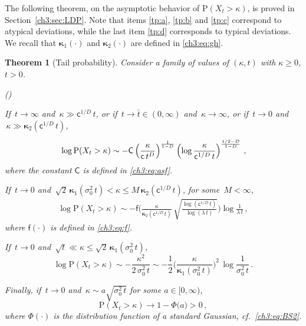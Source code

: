 \documentclass[a4paper,reqno,11pt]{amsart}
\numberwithin{equation}{section}
\newtheorem{theorem}{Theorem}[section]
\newcommand{\PEfont}{\mathrm}
\renewcommand{\P}{\ensuremath{\PEfont P}}
\newcommand\sfc{\mathsf{c}}
\newcommand\sff{\mathsf{f}}
\newcommand\sfC{\mathsf{C}}
\newenvironment{aenumerate}{%
\renewcommand{\theenumi}{\alph{enumi}}%
\renewcommand{\labelenumi}{{\rm(\theenumi)}}%
\begin{list}{\labelenumi}
	{%
	\setlength{\itemsep}{0.4em}%
	\setlength{\topsep}{0.5em}%
	\setlength\leftmargin{2.45em}%
	\setlength\labelwidth{2.05em}%
	\setlength{\labelsep}{0.4em}%
	\usecounter{enumi}%
	}%
	}%
{\end{list}
}
\newcommand\bkappa{\boldsymbol{\kappa}}
\begin{document}
\smallskip

The following theorem, on the asymptotic behavior
of $\P(X_t > \kappa)$, is proved in Section~\ref{ch3:sec:LDP}.
Note that items \eqref{tp:a}, \eqref{tp:b} and \eqref{tp:c} correspond to atypical deviations,
while the last item \eqref{tp:d} corresponds to typical deviations.
We recall that $\bkappa_1(\cdot)$ and $\bkappa_2(\cdot)$
are defined in \eqref{ch3:eq:gh}.

\begin{theorem}[Tail probability]\label{ch3:th:tailprob}
Consider a family of values of $(\kappa,t)$ with $\kappa \ge 0$, $t > 0$.
\begin{aenumerate}
\item\label{tp:a} If $\,t \to \infty$ and $\,\kappa \gg \sfc^{1/D} \, t$, or if
$\,t \to \bar t \in (0,\infty)$ and $\,\kappa \to \infty$,
or if $\,t\to 0$ and $\,\kappa \gg \bkappa_2(\sfc^{1/D} \, t)$,
\begin{equation} \label{ch3:eq:Cramer2}
	\rule{0pt}{1.9em}
	\log\P(X_t > \kappa) \sim  
	- \sfC \left( \frac{\kappa}{ \sfc \, t^D}\right)^{\frac{1}{1-D}}
	\left(\log \frac{\kappa}{ \sfc^{1/D} \, t}\right)^{\frac{1/2-D}{1-D}}  \,,
\end{equation}
where the constant $\sfC$ is defined in \eqref{ch3:eq:asf}.

\item\label{tp:b} If $\,t\to 0$ and $\,\sqrt{2}\,\bkappa_1(\sigma_0^2 \,t) <
\kappa \le M \, \bkappa_2( \sfc^{1/D} \,t)$, for some $\,M < \infty$,
\begin{align}\label{ch3:eq:gentail}
	\log\P(X_t > \kappa) \sim 
	- \sff \Bigg(\frac{\kappa}{\bkappa_2( \sfc^{1/D} \,t)}
	\, \sqrt{\frac{\log (\sfc^{1/D} \, t)}{\log (\lambda \, t)} } \Bigg) 
	\log \frac{1}{\lambda \,t}  \,,
\end{align}
where $\sff(\cdot)$ is defined in \eqref{ch3:eq:f}.

\item\label{tp:c} 
If $\,t\to 0$ and $\,\sqrt{t} \ll \kappa \le \sqrt{2} \, \bkappa_1(\sigma_0^2 \, t)$,
\begin{equation} \label{ch3:eq:withoutfa2}
	\log\P(X_t > \kappa) \sim - \frac{\kappa^2}{2\,\sigma_0^2 \, t}
	\sim - \frac{1}{2} \bigg( \frac{\kappa}{\bkappa_1( \sigma_0^2 \, t)}\bigg)^2
	\, \log\frac{1}{ \sigma_0^2 \, t} \,.
\end{equation}

\item\label{tp:d} Finally, if $\, t \to 0$ and $\,\kappa \sim a \sqrt{ \sigma_0^2 \, t}$
for some $a \in [0,\infty)$,
\begin{equation}\label{ch3:eq:boh}
	\P(X_t > \kappa) \to 1 - \Phi\big(a\big) > 0 \,,
\end{equation}
where $\Phi(\cdot)$ is the distribution function of a
standard Gaussian, cf.\ \eqref{ch3:eq:BS2}.
\end{aenumerate}
\end{theorem}
\end{document}
